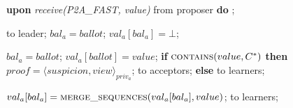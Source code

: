 \begin{algorithm}
\begin{algorithmic}[1]
		\State		
		\State \textbf{upon} \textit{receive(P2A\_FAST, value)} from proposer \textbf{do}
		\State \hspace{\algorithmicindent} ;
				
		\State
		\State {} to leader;
		\State $bal_a = ballot$;	
		\State $val_a[bal_a] = \bot$;	
		\EndIf
		\EndFunction
	
		\State
		\State $bal_a = ballot$;
		\State $val_a[ballot] = value$;
		\State \textbf{if} $\Call{contains}{value, C^*}$ \textbf{then}
		\State \hspace{\algorithmicindent} $proof = \langle suspicion, view \rangle_{priv_a}$;
		\State \hspace{\algorithmicindent}  to acceptors;
		\State \textbf{else}
		\State \hspace{\algorithmicindent} to learners;
		\EndIf
		\EndFunction
		
		\State
		\State $val_a[bal_a] =  \Call{merge\_sequences}{val_a[bal_a], value}$;
		\State {} to learners;
		\EndIf
		\EndFunction
	\end{algorithmic}
\end{algorithm}

